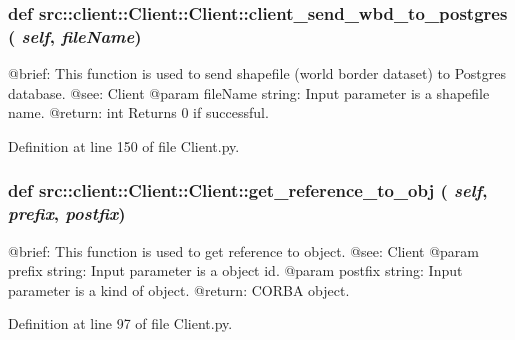 \hypertarget{classsrc_1_1client_1_1Client_1_1Client_a81a9adc6a52a89f210fdb8d4aa65ea9d}{
\subsubsection[{client\_\-send\_\-wbd\_\-to\_\-postgres}]{\setlength{\rightskip}{0pt plus 5cm}def src::client::Client::Client::client\_\-send\_\-wbd\_\-to\_\-postgres ( {\em self}, \/   {\em fileName})}}
\label{classsrc_1_1client_1_1Client_1_1Client_a81a9adc6a52a89f210fdb8d4aa65ea9d}
\begin{DoxyVerb}
@brief: This function is used to send shapefile (world border dataset) to Postgres database.
@see: Client
@param fileName string: Input parameter is a shapefile name.
@return: int Returns 0 if successful.  
\end{DoxyVerb}
 

Definition at line 150 of file Client.py.

\hypertarget{classsrc_1_1client_1_1Client_1_1Client_a67d86b5dae13a77b7b9254d9945d1928}{
\subsubsection[{get\_\-reference\_\-to\_\-obj}]{\setlength{\rightskip}{0pt plus 5cm}def src::client::Client::Client::get\_\-reference\_\-to\_\-obj ( {\em self}, \/   {\em prefix}, \/   {\em postfix})}}
\label{classsrc_1_1client_1_1Client_1_1Client_a67d86b5dae13a77b7b9254d9945d1928}
\begin{DoxyVerb}
@brief: This function is used to get reference to object.
@see: Client
@param prefix string: Input parameter is a object id.
@param postfix string: Input parameter is a kind of object.
@return: CORBA object.  
\end{DoxyVerb}
 

Definition at line 97 of file Client.py.



